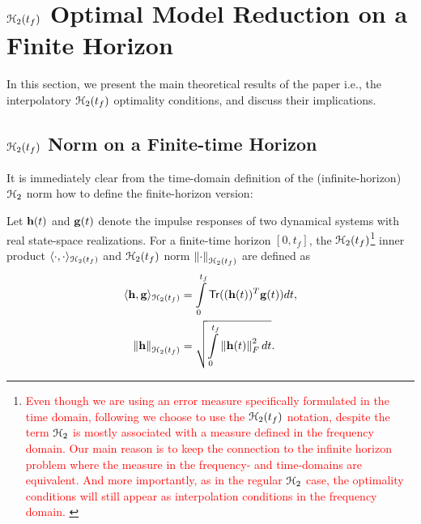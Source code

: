 \documentclass[twocolumn]{autart}
\begin{document}
\section{$\EuScript{H}_2(t_f)$ Optimal Model Reduction on a Finite Horizon}  \label{sec:main} 
%
{\color{red}
In this section, we present  the main theoretical results of the paper i.e., the interpolatory $\EuScript{H}_2(t_f)$  optimality conditions, and discuss their implications.}



  
\subsection{$\EuScript{H}_2(t_f)$ Norm on a Finite-time Horizon}
It is immediately clear from the time-domain definition of the (infinite-horizon) $\EuScript{H}_2$ norm how to define the finite-horizon version:
\begin{Definition}\label{innerh2}
Let $\mathbf{h}(t)$ and $\mathbf{g}(t)$ denote the impulse responses of two dynamical systems with real state-space realizations.  
For a finite-time horizon 
$[0,t_f]$, the $\EuScript{H}_2(t_f)$\footnote{\textcolor{red}{Even though we are using an error measure specifically formulated in the time domain,   following \cite{RedK17,GoyR17} we choose to use  the $\EuScript{H}_2(t_f)$ notation, despite the term $\EuScript{H}_2$  is mostly associated with a measure defined in the frequency domain. Our main reason is to keep the connection to the infinite horizon problem where the measure in the frequency- and time-domains are equivalent. And more importantly, as in the regular $\EuScript{H}_2$ case, the optimality conditions will still appear as interpolation conditions in the frequency domain. 
 }}
   inner product $\langle \cdot, \cdot \rangle_{\EuScript{H}_2(t_f)}$ 
and $\EuScript{H}_2(t_f)$ norm $\left\lVert\cdot\right\rVert_{\EuScript{H}_2(t_f)}$ are defined as  
\begin{align*}
\langle \h, \g \rangle_{\ch_2(\tf)} &=\int_0^{\tf} \mathsf{Tr}( (\h(t))^T \g(t)) dt, \\%
\norm{\h}_{\ch_2(\tf)} &=\sqrt{\int_0^{\tf} \norm{\h(t)}_F^2 dt}.
\end{align*}

\end{Definition}
\end{document}
